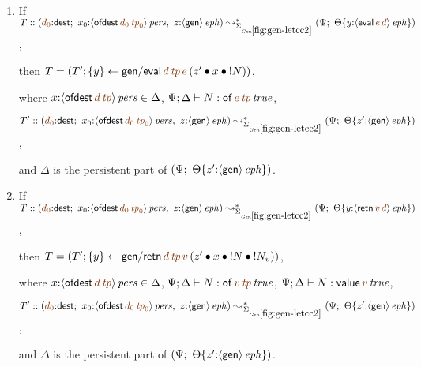 \newpage
\begin{lemma} ~
\begin{enumerate}
\item If $T :: \left(\lf{d_0}{:}{\sf dest}; ~ x_0{:}\ispers{\susp{{\sf
          ofdest}\,\lf{d_0}\,\lf{{\it tp}_0}}}, ~ z{:}\iseph{\susp{{\sf
          gen}}}\right) \leadsto^*_{\siggenletcc} \left(\Psi; ~
    \tackon{\Theta}{y{:}\iseph{\susp{{\sf
            eval}\,\lf{e}\,\lf{d}}}}\right)$,

    then $T = (T'; \trstep{y}{{\sf gen/eval}\,\lf{d}\,\lf{{\it tp}}\,\lf{e}\,
      (\tfuser{z'}{\tfuser{x}{\tbangr{N}}})})$,

    where $x{:}\ispers{\susp{{\sf ofdest}\,\lf{d}\,\lf{{\it tp}}}} \in \Delta$,
    $\Psi; \Delta \vdash N : \isconc{{\sf of}\,\lf{e}\,\lf{{\it tp}}}$,
    
    $T' :: \left(\lf{d_0}{:}{\sf dest}; ~ x_0{:}\ispers{\susp{{\sf
          ofdest}\,\lf{d_0}\,\lf{{\it tp}_0}}}, ~ z{:}\iseph{\susp{{\sf
          gen}}}\right) \leadsto^*_{\siggenletcc}
          \left(\Psi; ~ \tackon{\Theta}{z'{:}\iseph{\susp{{\sf gen}}}}\right)$,

    and $\Delta$ is the persistent part of 
    $\left(\Psi; ~ {\Theta}\{{z'{:}{\langle {{\sf gen}} \rangle}\,{{\it eph}}}\}\right)$.

\medskip
\item If $T :: \left(\lf{d_0}{:}{\sf dest}; ~ x_0{:}\ispers{\susp{{\sf
          ofdest}\,\lf{d_0}\,\lf{{\it tp}_0}}}, ~ z{:}\iseph{\susp{{\sf
          gen}}}\right) \leadsto^*_{\siggenletcc} \left(\Psi; ~
    \tackon{\Theta}{y{:}\iseph{\susp{{\sf
            retn}\,\lf{v}\,\lf{d}}}}\right)$,

    then $T = (T'; \trstep{y}{{\sf gen/retn}\,\lf{d}\,\lf{{\it tp}}\,\lf{v}\,
      (\tfuser{z'}{\tfuser{x}{\tfuser{\tbangr{N}}{\tbangr{N_v}}}})})$,

    where $x{:}\ispers{\susp{{\sf ofdest}\,\lf{d}\,\lf{{\it tp}}}} \in \Delta$,
    $\Psi; \Delta \vdash N : \isconc{{\sf of}\,\lf{v}\,\lf{{\it tp}}}$,
    $\Psi; \Delta \vdash N : \isconc{{\sf value}\,\lf{v}}$,
    
    $T' :: \left(\lf{d_0}{:}{\sf dest}; ~ x_0{:}\ispers{\susp{{\sf
          ofdest}\,\lf{d_0}\,\lf{{\it tp}_0}}}, ~ z{:}\iseph{\susp{{\sf
          gen}}}\right) \leadsto^*_{\siggenletcc}
          \left(\Psi; ~ \tackon{\Theta}{z'{:}\iseph{\susp{{\sf gen}}}}\right)$,

    and $\Delta$ is the persistent part of 
    $\left(\Psi; ~ {\Theta}\{{z'{:}{\langle {{\sf gen}} \rangle}\,{{\it eph}}}\}\right)$.



\end{enumerate}
\end{lemma}
